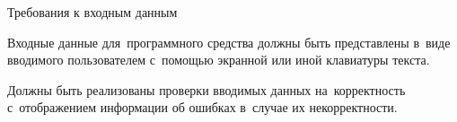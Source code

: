 \subsubsection{} Требования к входным данным
\label{sec:analysis:research:req:inputs}

Входные данные для~программного средства должны быть представлены в~виде вводимого пользователем с~помощью экранной или иной клавиатуры текста.

Должны быть реализованы проверки вводимых данных на~корректность с~отображением информации об ошибках в~случае их некорректности.